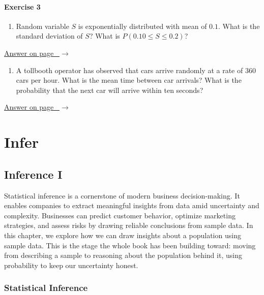 \documentclass[
  11pt,
  letterpaper,
  DIV=11,
  numbers=noendperiod,
  oneside,
  open=any]{scrreprt}
\providecommand{\tightlist}{%
  \setlength{\itemsep}{0pt}\setlength{\parskip}{0pt}}\usepackage{longtable,booktabs,array}
\newcommand{\bsanswerref}[1]{%
  \par\nopagebreak\hypertarget{q-#1}{}\label{q-#1}%
  {\raggedleft\sffamily\footnotesize\hyperlink{a-#1}{\textcolor{bsaccent}{Answer on page \pageref{a-#1}\ $\rightarrow$}}\par}%
  \medskip}
\begin{document}
\subsection*{Exercise 3}\label{exercise-3-8}

\begin{enumerate}
\def\labelenumi{\arabic{enumi}.}
\tightlist
\item
  Random variable \(S\) is exponentially distributed with mean of
  \(0.1\). What is the standard deviation of \(S\)? What is
  \(P(0.10 \leq S \leq 0.2)\)?
\end{enumerate}

\bsanswerref{bsans102}

\begin{enumerate}
\def\labelenumi{\arabic{enumi}.}
\setcounter{enumi}{1}
\tightlist
\item
  A tollbooth operator has observed that cars arrive randomly at a rate
  of \(360\) cars per hour. What is the mean time between car arrivals?
  What is the probability that the next car will arrive within ten
  seconds?
\end{enumerate}

\bsanswerref{bsans103}

\part{Infer}

\chapter{Inference I}\label{inference-i}

Statistical inference is a cornerstone of modern business
decision-making. It enables companies to extract meaningful insights
from data amid uncertainty and complexity. Businesses can predict
customer behavior, optimize marketing strategies, and assess risks by
drawing reliable conclusions from sample data. In this chapter, we
explore how we can draw insights about a population using sample data.
This is the stage the whole book has been building toward: moving from
describing a sample to reasoning about the population behind it, using
probability to keep our uncertainty honest.

\section{Statistical Inference}\label{statistical-inference}
\end{document}
